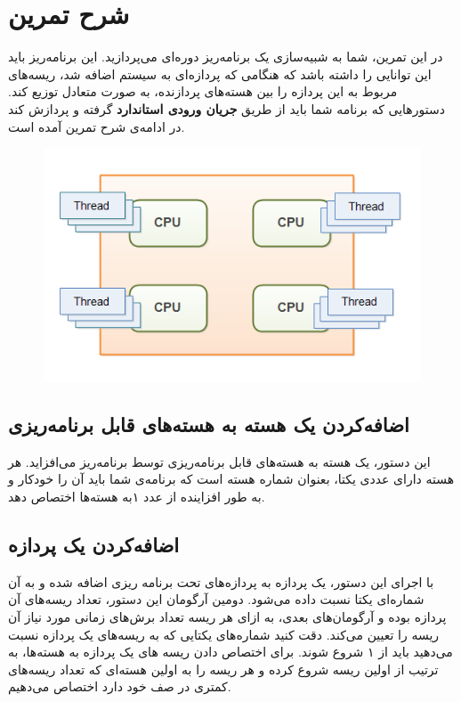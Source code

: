 \documentclass{utap}
\begin{document}
	\section{شرح تمرین}
	\hspace{5mm}
	در این تمرین، شما به شبیه‌سازی یک برنامه‌ریز دوره‌ای می‌پردازید. این برنامه‌ریز باید این توانایی را داشته باشد که هنگامی که پردازه‌ای به سیستم اضافه شد، ریسه‌های مربوط به این پردازه را بین هسته‌های پردازنده، به صورت متعادل توزیع کند. دستورهایی که برنامه شما باید از طریق \textbf{جریان ورودی استاندارد} گرفته و پردازش کند در ادامه‌ی شرح تمرین آمده است.
	
	\begin{figure}[H]
		\centering
		\includegraphics[width=0.5 \textwidth]{ThreadsOnCore.png}     
	\end{figure}
	
	
	\subsection{اضافه‌کردن یک هسته به هسته‌های قابل برنامه‌ریزی}
	\hspace{5mm}
	این دستور، یک هسته به هسته‌های قابل برنامه‌ریزی توسط برنامه‌ریز می‌افزاید. هر هسته دارای عددی یکتا، بعنوان شماره هسته است که برنامه‌ی شما باید آن را خودکار و به طور افزاینده از عدد ۱به هسته‌ها اختصاص دهد.

	 \linespread{1.6}
	\begin{latin}%
		\centering
		\begin{minipage}[t]{1\textwidth}
			{}
			{}
		\end{minipage}%
	\end{latin}
	
	\subsection{اضافه‌کردن یک پردازه}
	\hspace{5mm}
	با اجرای این دستور، یک پردازه به پردازه‌های تحت برنامه ریزی اضافه‌ شده و به آن شماره‌ا‌‌ی یکتا نسبت داده می‌شود. دومین آرگومان این دستور، تعداد ریسه‌های آن پردازه بوده و آرگومان‌‌های بعدی، به ازای هر ریسه تعداد برش‌های زمانی مورد نیاز آن ریسه را تعیین می‌کند. دقت کنید شماره‌‌ها‌ی یکتایی که به ریسه‌های یک پردازه نسبت می‌دهید باید از ۱ شروع شوند. برای اختصاص دادن ریسه ‌های یک پردازه به هسته‌ها، به ترتیب از اولین ریسه شروع کرده و هر ریسه را به اولین هسته‌ای  که تعداد ریسه‌های کمتری در صف خود دارد اختصاص می‌دهیم.
	
\end{document}
